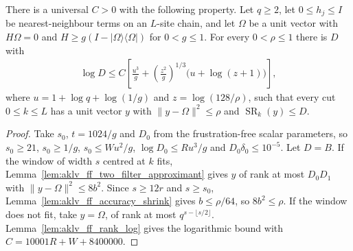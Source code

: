 \begin{lemma}
    \label{lem:aklv_ff_per_cut}
    \leanok
    There is a universal $C>0$ with the following property. Let $q\ge2$, let
    $0\le h_j\le I$ be nearest-neighbour terms on an $L$-site chain, and let
    $\Omega$ be a unit vector with $H\Omega=0$ and
    $H\ge g(I-|\Omega\rangle\langle\Omega|)$ for $0<g\le1$. For every
    $0<\rho\le1$ there is $D$ with
    \begin{align*}
        \log D\le C\left[\frac{u^3}{g}+\left(\frac{z^2}{g}\right)^{1/3}
            \bigl(u+\log(z+1)\bigr)\right],
    \end{align*}
    where $u=1+\log q+\log(1/g)$ and $z=\log(128/\rho)$, such that every cut
    $0\le k\le L$ has a unit vector $y$ with $\|y-\Omega\|^2\le\rho$ and
    $\operatorname{SR}_k(y)\le D$.
\end{lemma}
\begin{proof}
    \leanok
    Take $s_0$, $t=1024/g$ and $D_0$ from the frustration-free scalar
    parameters, so $s_0\ge21$, $s_0\ge1/g$, $s_0\le Wu^2/g$,
    $\log D_0\le Ru^3/g$ and $D_0\delta_0\le10^{-5}$. Let $D=B$.
    If the window of width $s$ centred at $k$ fits,
    Lemma~\ref{lem:aklv_ff_two_filter_approximant} gives $y$ of rank at most
    $D_0D_1$ with $\|y-\Omega\|^2\le8b^2$. Since $s\ge12r$ and $s\ge s_0$,
    Lemma~\ref{lem:aklv_ff_accuracy_shrink} gives $b\le\rho/64$, so
    $8b^2\le\rho$. If the window does not fit, take $y=\Omega$, of rank at
    most $q^{s-\lfloor s/2\rfloor}$.
    Lemma~\ref{lem:aklv_ff_rank_log} gives the logarithmic bound with
    $C=10001R+W+8400000$.
\end{proof}

